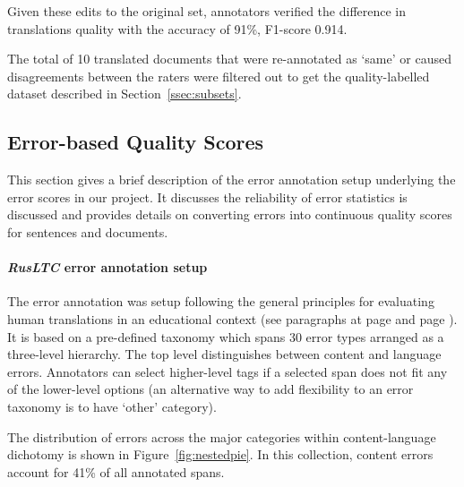 Given these edits to the original set, annotators verified the difference in translations quality with the accuracy of 91\%, F1-score 0.914.

The total of 10 translated documents that were re-annotated as `same' or caused disagreements between the raters were filtered out to get the quality-labelled dataset described in Section~\ref{ssec:subsets}.

\subsection{\label{ssec:err}Error-based Quality Scores}
This section gives a brief description of the error annotation setup underlying the error scores in our project. It discusses the reliability of error statistics is discussed and provides details on converting errors into continuous quality scores for sentences and documents.  

\paragraph{\textit{RusLTC} error annotation setup} 
The error annotation was setup following the general principles for evaluating human translations in an educational context (see paragraphs at page \pageref{par:ht_ass} and page \pageref{par:errors_best}). It is based on a pre-defined taxonomy which spans 30 error types arranged as a three-level hierarchy. The top level distinguishes between content and language errors. Annotators can select higher-level tags if a selected span does not fit any of the lower-level options (an alternative way to add flexibility to an error taxonomy is to have `other' category).

The distribution of errors across the major categories within content-language dichotomy is shown in Figure~\ref{fig:nestedpie}. In this collection, content errors account for 41\% of all annotated spans. 


